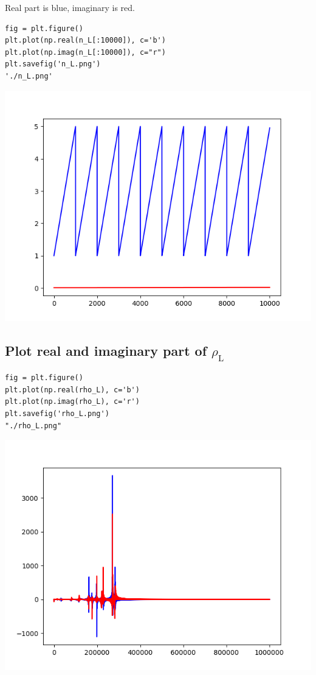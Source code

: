 \documentclass[11pt]{article}
\begin{document}
Real part is blue, imaginary is red.

\begin{verbatim}
fig = plt.figure()
plt.plot(np.real(n_L[:10000]), c='b')
plt.plot(np.imag(n_L[:10000]), c="r")
plt.savefig('n_L.png')
'./n_L.png'

\end{verbatim}

\begin{center}
\includegraphics[width=.9\linewidth]{./n_L.png}
\end{center}

\subsection{Plot real and imaginary part of \(\rho_{\text{L}}\)}
\label{sec:orgc9d8cf9}

\begin{verbatim}
fig = plt.figure()
plt.plot(np.real(rho_L), c='b')
plt.plot(np.imag(rho_L), c='r')
plt.savefig('rho_L.png')
"./rho_L.png"
\end{verbatim}

\begin{center}
\includegraphics[width=.9\linewidth]{./rho_L.png}
\end{center}
\end{document}
